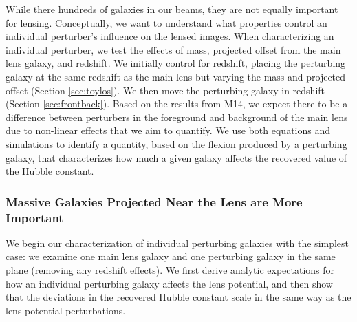 \documentclass{emulateapj}
\begin{document}
\begin{figure}[t]
\begin{center}
{}
\end{center}
\end{figure}

While there hundreds of galaxies in our beams, they are not equally important for lensing.  Conceptually, we want to understand what properties control an individual perturber's influence on the lensed images. When characterizing an individual perturber, we test the effects of mass, projected offset from the main lens galaxy, and redshift. We initially control for redshift, placing the perturbing galaxy at the same redshift as the main lens but varying the mass and projected offset (Section \ref{sec:toylos}). We then move the perturbing galaxy in redshift (Section \ref{sec:frontback}). Based on the results from M14, we expect there to be a difference between perturbers in the foreground and background of the main lens due to non-linear effects that we aim to quantify. We use both equations and simulations to identify a quantity, based on the flexion produced by a perturbing galaxy, that characterizes how much a given galaxy affects the recovered value of the Hubble constant.

\subsubsection{Massive Galaxies Projected Near the Lens are More Important \label{sec:toylos}}

We begin our characterization of individual perturbing galaxies with the simplest case: we examine one main lens galaxy and one perturbing galaxy in the same plane (removing any redshift effects). We first derive analytic expectations for how an individual perturbing galaxy affects the lens potential, and then show that the deviations in the recovered Hubble constant scale in the same way as the lens potential perturbations.
\end{document}
